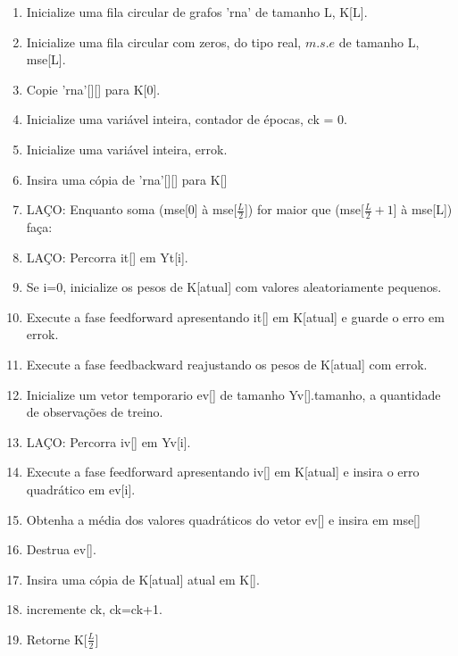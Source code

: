 \documentclass[	12pt, Times, openright, twoside, a4paper, english, brazil]{abntex2}
\begin{document}
            \begin{enumerate}
                \item Inicialize uma fila circular de grafos 'rna' de tamanho L, K[L].
                \item Inicialize uma fila circular com zeros, do tipo real, $m.s.e$ de tamanho L, mse[L].
                \item Copie 'rna'[][] para K[0].
                \item Inicialize uma variável inteira, contador de épocas, ck = 0.
                \item Inicialize uma variável inteira, errok.
                \item Insira uma cópia de 'rna'[][] para K[]
                
                \item LAÇO: Enquanto soma (mse[0] à mse[$\frac{L}{2}$]) for maior que (mse[$\frac{L}{2} +1$] à mse[L]) faça:
                \item   LAÇO: Percorra it[] em Yt[i].
                \item     Se i=0, inicialize os pesos de K[atual] com valores aleatoriamente pequenos. 
                \item     Execute a fase feedforward apresentando it[] em K[atual] e guarde o erro em errok.
                \item     Execute a fase feedbackward reajustando os pesos de K[atual] com errok.

                \item   Inicialize um vetor temporario ev[] de tamanho Yv[].tamanho, a quantidade de observações de treino.

                \item   LAÇO: Percorra iv[] em Yv[i].
                \item     Execute a fase feedforward apresentando iv[] em K[atual] e insira o erro quadrático em ev[i].

                \item   Obtenha a média dos valores quadráticos do vetor ev[] e insira em mse[]
                \item   Destrua ev[].
                \item   Insira uma cópia de K[atual] atual em K[].
                \item   incremente ck, ck=ck+1.

                \item Retorne K[$\frac{L}{2}$]
            \end{enumerate}
\end{document}
